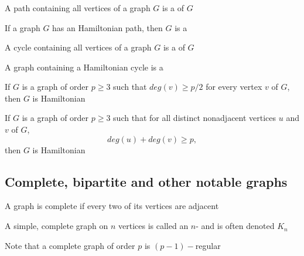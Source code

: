 \documentclass[aspectratio=43]{beamer}
\begin{document}
\begin{frame}\frametitle{}
\begin{definition}
	A path containing all vertices of a graph $G$ is a  of $G$
\end{definition}
\vfill
\begin{definition}
	If a graph $G$ has an Hamiltonian path, then $G$ is a 
\end{definition}
\vfill
\begin{definition}
	A cycle containing all vertices of a graph $G$ is a  of $G$
\end{definition}
\vfill
\begin{definition}
	A graph containing a Hamiltonian cycle is a 
\end{definition}
\end{frame}

\begin{frame}
\begin{theorem}
	If $G$ is a graph of order $p\geq 3$ such that $deg(v)\geq p/2$ for every vertex $v$ of $G$, then $G$ is Hamiltonian
\end{theorem}
\vfill
\begin{theorem}
	If $G$ is a graph of order $p\geq 3$ such that for all distinct nonadjacent vertices $u$ and $v$ of $G$, $$deg(u)+deg(v)\geq p,$$ 
	then $G$ is Hamiltonian
\end{theorem}
\end{frame}

\subsection{Complete, bipartite and other notable graphs}
\begin{frame}
\begin{definition}
A graph is complete if every two of its vertices are adjacent
\end{definition}
\vfill
\begin{definition}[$n$-clique]
	A simple, complete graph on $n$ vertices is called an $n$- and is often denoted $K_n$
\end{definition}
\vfill
Note that a complete graph of order $p$ is $(p-1)-$regular
\end{frame}
\end{document}
